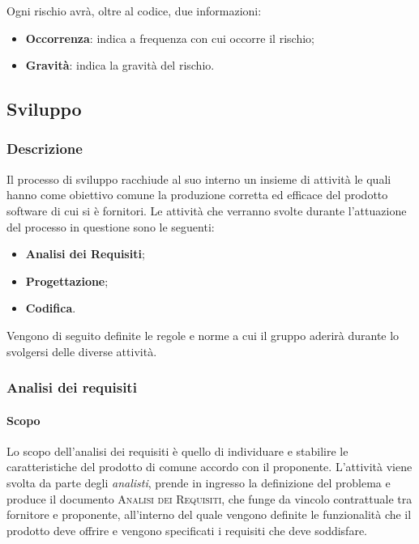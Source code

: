 Ogni rischio avrà, oltre al codice, due informazioni: 
\begin{itemize}
	\item \textbf{Occorrenza}: indica a frequenza con cui occorre il rischio;
	\item \textbf{Gravità}: indica la gravità del rischio.
\end{itemize}

\subsection{Sviluppo}
\label{sub:sviluppo}

\subsubsection{Descrizione}
\label{ssub:sviluppo:descrizione}

Il processo di sviluppo racchiude al suo interno un insieme di attività le quali hanno come obiettivo comune la produzione corretta ed 
efficace del prodotto software di cui si è fornitori. Le attività che verranno svolte durante l'attuazione del processo in questione sono 
le seguenti: 
\begin{itemize}
	\item \textbf{Analisi dei Requisiti};
	\item \textbf{Progettazione};
	\item \textbf{Codifica}.
\end{itemize}
Vengono di seguito definite le regole e norme a cui il gruppo aderirà durante lo svolgersi delle diverse attività.

\subsubsection{Analisi dei requisiti}
\label{ssub:analisi}

\paragraph{Scopo}
\label{par:analisi:scopo}

Lo scopo dell'analisi dei requisiti è quello di individuare e stabilire le caratteristiche del prodotto di comune accordo con il proponente. 
L'attività viene svolta da parte degli \emph{analisti}, prende in ingresso la definizione del problema e produce il documento 
\textsc{Analisi dei Requisiti}, che funge da vincolo contrattuale tra fornitore e proponente, all'interno del quale vengono definite 
le funzionalità che il prodotto deve offrire e vengono specificati i requisiti che deve soddisfare.

